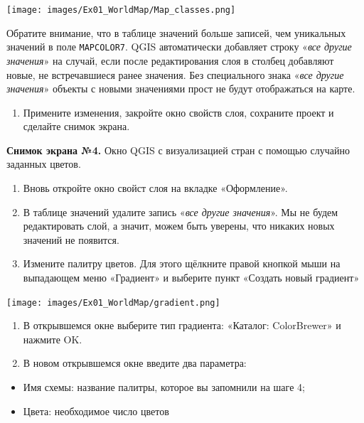 \documentclass[
  12pt,
]{book}
\providecommand{\tightlist}{%
  \setlength{\itemsep}{0pt}\setlength{\parskip}{0pt}}
\begin{document}
\texttt{[image: images/Ex01\_WorldMap/Map\_classes.png]}

Обратите внимание, что в таблице значений больше записей, чем уникальных значений в поле \texttt{MAPCOLOR7}. QGIS автоматически добавляет строку «\emph{все другие значения}» на случай, если после редактирования слоя в столбец добавляют новые, не встречавшиеся ранее значения. Без специального знака «\emph{все другие значения}» объекты с новыми значениями прост не будут отображаться на карте.

\begin{enumerate}
\def\labelenumi{\arabic{enumi}.}
\setcounter{enumi}{9}
\tightlist
\item
  Примените изменения, закройте окно свойств слоя, сохраните проект и сделайте снимок экрана.
\end{enumerate}

\textbf{Снимок экрана №4.} Окно QGIS с визуализацией стран с помощью случайно заданных цветов.

\begin{enumerate}
\def\labelenumi{\arabic{enumi}.}
\setcounter{enumi}{10}
\item
  Вновь откройте окно свойст слоя на вкладке «Оформление».
\item
  В таблице значений удалите запись «\emph{все другие значения}». Мы не будем редактировать слой, а значит, можем быть уверены, что никаких новых значений не появится.
\item
  Измените палитру цветов. Для этого щёлкните правой кнопкой мыши на выпадающем меню «Градиент» и выберите пункт «Создать новый градиент»
\end{enumerate}

\texttt{[image: images/Ex01\_WorldMap/gradient.png]}

\begin{enumerate}
\def\labelenumi{\arabic{enumi}.}
\setcounter{enumi}{13}
\item
  В открывшемся окне выберите тип градиента: «Каталог: ColorBrewer» и нажмите OK.
\item
  В новом открывшемся окне введите два параметра:
\end{enumerate}

\begin{itemize}
\tightlist
\item
  Имя схемы: название палитры, которое вы запомнили на шаге 4;
\item
  Цвета: необходимое число цветов
\end{itemize}
\end{document}
